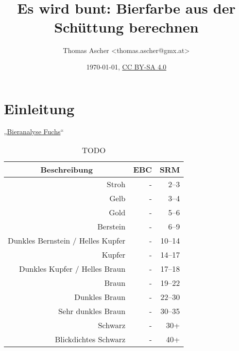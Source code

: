 \documentclass[a4paper,parskip=half]{scrartcl}
\title{Es wird bunt: Bierfarbe aus der Schüttung berechnen}
\author{Thomas Ascher <thomas.ascher@gmx.at>}
\date{\today, \href{http://creativecommons.org/licenses/by-sa/4.0/}{CC BY-SA 4.0}}
\begin{document}
\maketitle

\section*{Einleitung}

„\href{https://bieranalyse.de}{Bieranalyse Fuchs}“


\begin{table}[H]
\centering
\begin{tabular}{rrr}
\toprule
\multicolumn{1}{c}{\textbf{Beschreibung}} & \multicolumn{1}{c}{\textbf{EBC}} & \multicolumn{1}{c}{\textbf{SRM}} \\
\midrule
Stroh & - & 2–3 \\
Gelb & - & 3–4 \\
Gold & - & 5–6 \\
Berstein & - & 6–9 \\
Dunkles Bernstein / Helles Kupfer & - & 10–14 \\
Kupfer & - & 14–17 \\
Dunkles Kupfer / Helles Braun & - & 17–18 \\
Braun & - & 19–22 \\
Dunkles Braun & - & 22–30 \\
Sehr dunkles Braun & - & 30–35 \\
Schwarz & - & 30+ \\
Blickdichtes Schwarz & - & 40+ \\
\bottomrule
\end{tabular}
\caption{TODO \parencite{BJCP2015}}
\label{table:bjcpcolor}
\end{table}

\parencite{BA2021}
\end{document}
